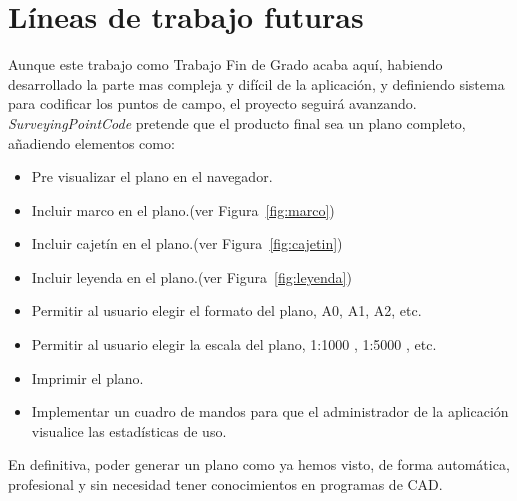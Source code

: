 \section{Líneas de trabajo futuras}

Aunque este trabajo como Trabajo Fin de Grado acaba aquí, habiendo desarrollado la parte mas compleja y difícil de la aplicación, y definiendo sistema para codificar los puntos de campo, el proyecto seguirá avanzando. \emph{SurveyingPointCode} pretende que el producto final sea un plano completo, añadiendo elementos como:



\begin{itemize}
\item Pre visualizar el plano en el navegador.
\item Incluir marco en el plano.(ver Figura~\ref{fig:marco})
\item Incluir cajetín en el plano.(ver Figura~\ref{fig:cajetin})
\item Incluir leyenda en el plano.(ver Figura~\ref{fig:leyenda})
\item Permitir al usuario elegir el formato del plano, A0, A1, A2, etc.
\item Permitir al usuario elegir la escala del plano, 1:1000 , 1:5000 , etc.
\item Imprimir el plano.
\item Implementar un cuadro de mandos para que el administrador de la aplicación visualice las estadísticas de uso.
\end{itemize}


En definitiva, poder generar un plano como ya hemos visto, de forma automática, profesional y sin necesidad tener conocimientos en programas de CAD.